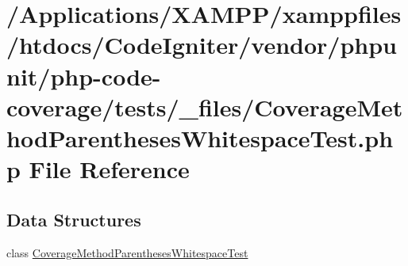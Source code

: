 \hypertarget{php-code-coverage_2tests_2__files_2_coverage_method_parentheses_whitespace_test_8php}{}\section{/\+Applications/\+X\+A\+M\+P\+P/xamppfiles/htdocs/\+Code\+Igniter/vendor/phpunit/php-\/code-\/coverage/tests/\+\_\+files/\+Coverage\+Method\+Parentheses\+Whitespace\+Test.php File Reference}
\label{php-code-coverage_2tests_2__files_2_coverage_method_parentheses_whitespace_test_8php}
\subsection*{Data Structures}
\begin{DoxyCompactItemize}
\item 
class \mbox{\hyperlink{class_coverage_method_parentheses_whitespace_test}{Coverage\+Method\+Parentheses\+Whitespace\+Test}}
\end{DoxyCompactItemize}
